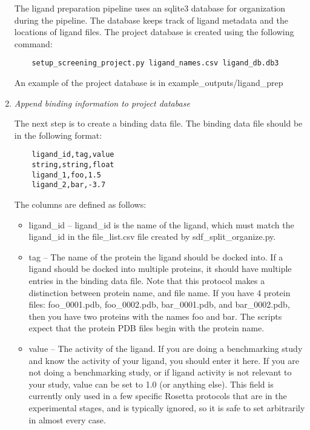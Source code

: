 \begin{enumerate}
	The ligand preparation pipeline uses an sqlite3 database for organization during the pipeline.
	The database keeps track of ligand metadata and the locations of ligand files.
	The project database is created using the following command:

	\begin{verbatim}
	setup_screening_project.py ligand_names.csv ligand_db.db3
	\end{verbatim}

  	An example of the project database is in example\_outputs/ligand\_prep
\item
	\emph{Append binding information to project database}

	The next step is to create a binding data file. The binding data file should be in the following format:

	\begin{verbatim}
	ligand_id,tag,value
	string,string,float
	ligand_1,foo,1.5
	ligand_2,bar,-3.7
	\end{verbatim}

	The columns are defined as follows:

	\begin{itemize}
	\itemsep1pt\parskip0pt
	\item
		ligand\_id -- ligand\_id is the name of the ligand, which must match the ligand\_id in the file\_list.csv file created by sdf\_split\_organize.py.
	\item
 		tag -- The name of the protein the ligand should be docked into.
		If a ligand should be docked into multiple proteins, it should have multiple entries in the binding data file.
		Note that this protocol makes a distinction between protein name, and file name.
		If you have 4 protein files: foo\_0001.pdb, foo\_0002.pdb, bar\_0001.pdb, and bar\_0002.pdb, then you have two proteins with the names foo and bar.
		The scripts expect that the protein PDB files begin with the protein name.
	\item
		value -- The activity of the ligand. If you are doing a benchmarking study and know the activity of your ligand, you should enter it here.
		If you are not doing a benchmarking study, or if ligand activity is not relevant to your study, value can be set to 1.0 (or anything else). 
		This field is currently only used in a few specific Rosetta protocols that are in the experimental stages, and is  typically ignored, so it is safe to set arbitrarily in almost every  case.
	\end{itemize}


\end{enumerate}
